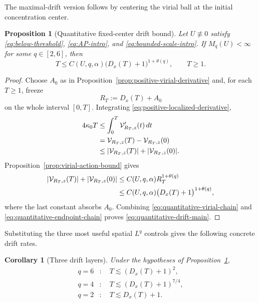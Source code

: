 \documentclass[preprint,12pt]{elsarticle}
\numberwithin{equation}{section}
\newtheorem{proposition}[theorem]{Proposition}
\newtheorem{corollary}[theorem]{Corollary}
\theoremstyle{remark}
\newcommand{\dd}{\,d}
\newcommand{\Vcal}{\mathcal V}
\begin{document}
The maximal-drift version follows by centering the virial ball at the initial concentration center.

\begin{proposition}[Quantitative fixed-center drift bound]\label{prop:quantitative-drift}
Let $U\not\equiv0$ satisfy \eqref{eq:below-threshold}, \eqref{eq:AP-intro}, and \eqref{eq:bounded-scale-intro}. If $M_q(U)<\infty$ for some $q\in[2,6]$, then
\begin{equation}\label{eq:quantitative-drift-main}
  T\le C(U,q,\alpha)
  \bigl(D_x(T)+1\bigr)^{1+\theta(q)},
  \qquad T\ge1.
\end{equation}
\end{proposition}

\begin{proof}
Choose $A_0$ as in Proposition~\ref{prop:positive-virial-derivative} and, for each $T\ge1$, freeze
\begin{equation*}
  R_T:=D_x(T)+A_0
\end{equation*}
on the whole interval $[0,T]$.  Integrating \eqref{eq:positive-localized-derivative},
\begin{align}
  4\kappa_0T
  &\le\int_0^T\Vcal_{R_T,z}'(t)\dd t\notag\\
  &=\Vcal_{R_T,z}(T)-\Vcal_{R_T,z}(0)\notag\\
  &\le|\Vcal_{R_T,z}(T)|+|\Vcal_{R_T,z}(0)|.
  \label{eq:quantitative-virial-chain}
\end{align}
Proposition~\ref{prop:virial-action-bound} gives
\begin{align}
  |\Vcal_{R_T,z}(T)|+|\Vcal_{R_T,z}(0)|
  &\le C(U,q,\alpha)R_T^{1+\theta(q)}\notag\\
  &\le C(U,q,\alpha)
  \bigl(D_x(T)+1\bigr)^{1+\theta(q)},
  \label{eq:quantitative-endpoint-chain}
\end{align}
where the last constant absorbs $A_0$.  Combining \eqref{eq:quantitative-virial-chain} and \eqref{eq:quantitative-endpoint-chain} proves \eqref{eq:quantitative-drift-main}.
\end{proof}

Substituting the three most useful spatial $L^q$ controls gives the following concrete drift rates.

\begin{corollary}[Three drift layers]\label{cor:three-drift-layers}
Under the hypotheses of Proposition~\ref{prop:quantitative-drift},
\begin{equation}\label{eq:three-drift-layers}
  \begin{aligned}
  q=6&:\quad T\lesssim(D_x(T)+1)^2,\\
  q=4&:\quad T\lesssim(D_x(T)+1)^{7/4},\\
  q=2&:\quad T\lesssim D_x(T)+1.
  \end{aligned}
\end{equation}
\end{corollary}
\end{document}
